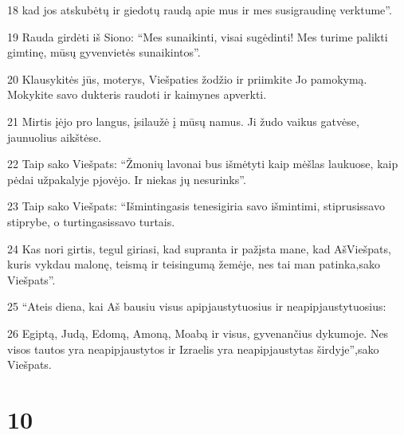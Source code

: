 \par 18 kad jos atskubėtų ir giedotų raudą apie mus ir mes susigraudinę verktume”. 
\par 19 Rauda girdėti iš Siono: “Mes sunaikinti, visai sugėdinti! Mes turime palikti gimtinę, mūsų gyvenvietės sunaikintos”. 
\par 20 Klausykitės jūs, moterys, Viešpaties žodžio ir priimkite Jo pamokymą. Mokykite savo dukteris raudoti ir kaimynes apverkti. 
\par 21 Mirtis įėjo pro langus, įsilaužė į mūsų namus. Ji žudo vaikus gatvėse, jaunuolius aikštėse. 
\par 22 Taip sako Viešpats: “Žmonių lavonai bus išmėtyti kaip mėšlas laukuose, kaip pėdai užpakalyje pjovėjo. Ir niekas jų nesurinks”. 
\par 23 Taip sako Viešpats: “Išmintingasis tenesigiria savo išmintimi, stiprusis­savo stiprybe, o turtingasis­savo turtais. 
\par 24 Kas nori girtis, tegul giriasi, kad supranta ir pažįsta mane, kad Aš­Viešpats, kuris vykdau malonę, teismą ir teisingumą žemėje, nes tai man patinka,­sako Viešpats”. 
\par 25 “Ateis diena, kai Aš bausiu visus apipjaustytuosius ir neapipjaustytuosius: 
\par 26 Egiptą, Judą, Edomą, Amoną, Moabą ir visus, gyvenančius dykumoje. Nes visos tautos yra neapipjaustytos ir Izraelis yra neapipjaustytas širdyje”,­sako Viešpats.



\chapter{10}


